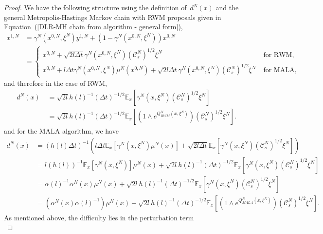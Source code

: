 \begin{proof}
 We have the following structure using the definition of~$d^N(x)$ and the general Metropolis-Hastings Markov chain with RWM proposals given in Equation~(\ref{DLR-MH chain from algorithm - general form}), 
 \begin{align*}
   x^{1,N} &  = \gamma^N(x^{0,N}, \xi^N) y^{1,N} + (1- \gamma^N(x^{0,N}, \xi^N) ) x^{0,N} \\
   &  = 
   \begin{cases}
     x^{0,N}  + \sqrt{2l \Delta t} \gamma^N(x^{0,N}, \xi^N) (\mathcal{C}_s^N)^{1/2} \xi^N \; & \text{for RWM,} \\
     x^{0,N}  + l \Delta t \gamma^N(x^{0,N}, \xi^N)  \mu^N(x^{0,N}) + \sqrt{2l \Delta t} \gamma^N(x^{0,N}, \xi^N) (\mathcal{C}_s^N)^{1/2} \xi^N \; & \text{for MALA,}
   \end{cases}
 \end{align*}
 and therefore in the case of RWM,
 \begin{equation*}
   \begin{split}
      d^N(x) & \; = \sqrt{2l}h(l)^{-1} (\Delta t)^{-1/2} \mathbb{E}_x[\gamma^N(x, \xi^N)(\mathcal{C}_s^N)^{1/2} \xi^N] \\
      & \; = \sqrt{2l}h(l)^{-1} (\Delta t)^{-1/2}  \mathbb{E}_x[ (1 \wedge e^{Q^N_{RWM}(x, \xi^N)}) (\mathcal{C}_s^N)^{1/2} \xi^N].
   \end{split}
 \end{equation*}
 and for the MALA algorithm, we have
  \begin{equation*}
   \begin{split}
     d^N(x) &  = (h(l) \Delta t)^{-1} \left( l \Delta t \mathbb{E}_x[\gamma^N(x, \xi^N)\mu^N(x)] +   \sqrt{2l\Delta t} \mathbb{E}_x[\gamma^N(x, \xi^N)(\mathcal{C}_s^N)^{1/2} \xi^N] \right) \\
      &  = l (h(l))^{-1}  \mathbb{E}_x[ \gamma^N(x, \xi^N)] \mu^N(x) +  \sqrt{2l}h(l)^{-1} (\Delta t)^{-1/2} \mathbb{E}_x[\gamma^N(x, \xi^N)(\mathcal{C}_s^N)^{1/2} \xi^N]  \\
      &  = \alpha(l)^{-1} \alpha^N(x) \mu^N(x) +   \sqrt{2l}h(l)^{-1} (\Delta t)^{-1/2} \mathbb{E}_x[\gamma^N(x, \xi^N)(\mathcal{C}_s^N)^{1/2} \xi^N] \\
      &  =  ( \alpha^N(x) \alpha(l)^{-1} ) \mu^N(x) +   \sqrt{2l}h(l)^{-1} (\Delta t)^{-1/2} \mathbb{E}_x[ (1 \wedge e^{Q^N_{MALA}(x, \xi^N)}) (\mathcal{C}_s^N)^{1/2} \xi^N].
   \end{split}
 \end{equation*}
 As mentioned above, the difficulty lies in the perturbation term
 \begin{equation}

\end{equation}
\end{proof}
